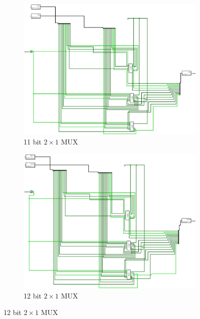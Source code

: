 \documentclass[12pt]{article}
\begin{document}
\begin{figure}[H]
    \centering
    \begin{subfigure}[b]{0.3\textwidth}
        \includegraphics[width=\textwidth]{images/MUX_11_bit.jpg}
        \caption{11 bit $2\times1$ MUX}
        \label{fig:11b2x1mux}
    \end{subfigure}
    \begin{subfigure}[b]{0.3\textwidth}
        \includegraphics[width=\textwidth]{images/MUX_12_bit.jpg}
        \caption{12 bit $2\times1$ MUX}
        \label{fig:12b2x1mux}
    \end{subfigure}
     \newline
     \newline

\end{figure}
\end{document}

